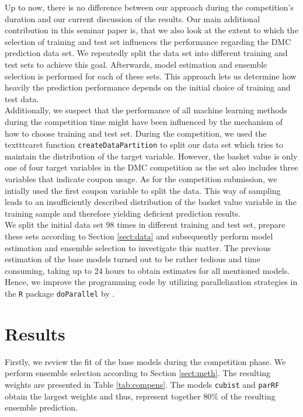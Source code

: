 \documentclass[12pt]{article}
\begin{document}
Up to now, there is no difference between our approach during the competition's duration and our current discussion of the results. Our main additional contribution in this seminar paper is, that we also look at the extent to which the selection of training and test set influences the performance regarding the DMC prediction data set. We repeatedly split the data set into different training and test sets to achieve this goal. Afterwards, model estimation and ensemble selection is performed for each of these sets.
This approach lets us determine how heavily the prediction performance depends on the initial choice of training and test data.  \\

Additionally, we suspect that the performance of all machine learning methods during the competition time might have been influenced by the mechanism of how to choose training and test set. During the competition, we used the texttt{caret} function \texttt{createDataPartition} to split our data set which tries to maintain the distribution of the target variable.
However, the basket value is only one of four target variables in the DMC competition as the set also includes three variables that indicate coupon usage. As for the competition submission, we intially used the first coupon variable to split the data. This way of sampling leads to an insufficiently described distribution of the basket value variable in the training sample and therefore yielding deficient prediction results. \\

We split the initial data set 98 times in different training and test set, prepare these sets according to Section \ref{sect:data} and subsequently perform model estimation and ensemble selection to investigate this matter. The previous estimation of the base models turned out to be rather tedious and time consuming, taking up to 24 hours to obtain estimates for all mentioned models. Hence, we improve the programming code by utilizing parallelization strategies in the \texttt{R} package \texttt{doParallel} by \cite{doParallel}.


\section{Results}
Firstly, we review the fit of the base models during the competition phase. We perform ensemble selection according to Section \ref{sect:meth}. The resulting weights are presented in Table \ref{tab:compens}. The models \texttt{cubist} and \texttt{parRF} obtain the largest weights and thus, represent together 80\% of the resulting ensemble prediction.
\end{document}

